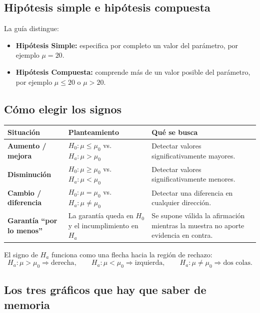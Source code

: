 \documentclass[11pt,a4paper]{article}
\begin{document}
\subsection{Hipótesis simple e hipótesis compuesta}

La guía distingue:
\begin{itemize}
\item \textbf{Hipótesis Simple:} especifica por completo un valor del parámetro, por ejemplo $\mu=20$.
\item \textbf{Hipótesis Compuesta:} comprende más de un valor posible del parámetro, por ejemplo $\mu\le20$ o $\mu>20$.
\end{itemize}

\subsection{Cómo elegir los signos}

\begin{table}[H]
\centering
\small
\begin{tabularx}{\textwidth}{>{\bfseries}p{3cm} X X}
\toprule
Situación & Planteamiento & Qué se busca \\
\midrule
Aumento / mejora & $H_0:\mu\le\mu_0$ vs. $H_a:\mu>\mu_0$ & Detectar valores significativamente mayores.\\
Disminución & $H_0:\mu\ge\mu_0$ vs. $H_a:\mu<\mu_0$ & Detectar valores significativamente menores.\\
Cambio / diferencia & $H_0:\mu=\mu_0$ vs. $H_a:\mu\neq\mu_0$ & Detectar una diferencia en cualquier dirección.\\
Garantía ``por lo menos'' & La garantía queda en $H_0$ y el incumplimiento en $H_a$ & Se supone válida la afirmación mientras la muestra no aporte evidencia en contra.\\
\bottomrule
\end{tabularx}
\end{table}

\begin{regla}
El signo de $H_a$ funciona como una flecha hacia la región de rechazo:
\[
H_a:\mu>\mu_0\Rightarrow\text{derecha},\qquad
H_a:\mu<\mu_0\Rightarrow\text{izquierda},\qquad
H_a:\mu\neq\mu_0\Rightarrow\text{dos colas}.
\]
\end{regla}

\subsection{Los tres gráficos que hay que saber de memoria}
\end{document}
